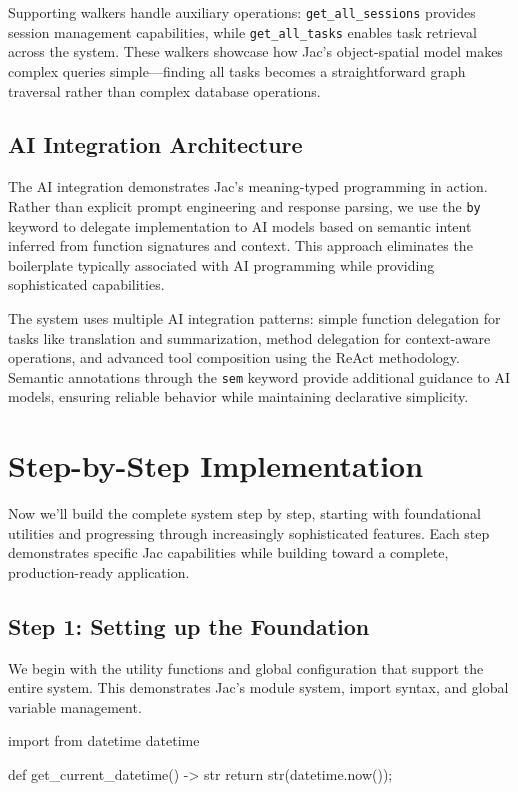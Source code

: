 Supporting walkers handle auxiliary operations: \texttt{get\_all\_sessions} provides session management capabilities, while \texttt{get\_all\_tasks} enables task retrieval across the system. These walkers showcase how Jac's object-spatial model makes complex queries simple—finding all tasks becomes a straightforward graph traversal rather than complex database operations.

\subsection{AI Integration Architecture}

The AI integration demonstrates Jac's meaning-typed programming in action. Rather than explicit prompt engineering and response parsing, we use the \texttt{by} keyword to delegate implementation to AI models based on semantic intent inferred from function signatures and context. This approach eliminates the boilerplate typically associated with AI programming while providing sophisticated capabilities.

The system uses multiple AI integration patterns: simple function delegation for tasks like translation and summarization, method delegation for context-aware operations, and advanced tool composition using the ReAct methodology. Semantic annotations through the \texttt{sem} keyword provide additional guidance to AI models, ensuring reliable behavior while maintaining declarative simplicity.

\section{Step-by-Step Implementation}

Now we'll build the complete system step by step, starting with foundational utilities and progressing through increasingly sophisticated features. Each step demonstrates specific Jac capabilities while building toward a complete, production-ready application.

\subsection{Step 1: Setting up the Foundation}

We begin with the utility functions and global configuration that support the entire system. This demonstrates Jac's module system, import syntax, and global variable management.

\begin{jacblock}
import from datetime { datetime }

def get_current_datetime() -> str {
    return str(datetime.now());
}
\end{jacblock}

